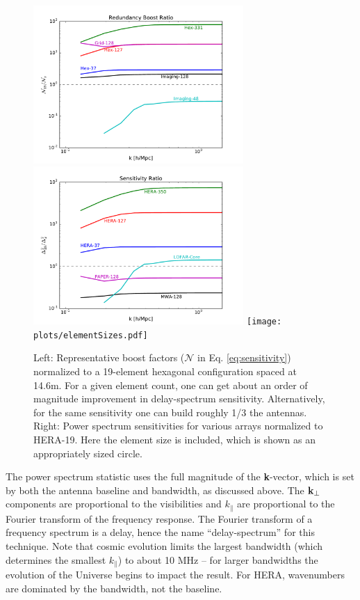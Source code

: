 \documentclass[preprint,11pt]{aastex}
\newcommand{\kvec}{{\bf k}}
\newcommand{\kvpr}{{\kvec_\perp}}
\def\kpar{k_{\|}}
\begin{document}
\begin{figure}[h!]
\centerline{
\includegraphics[height=6cm]{plots/boost.pdf}
\includegraphics[height=6cm]{plots/sensratio.pdf}
\texttt{[image: plots/elementSizes.pdf]}
}
\caption{Left: Representative boost factors ($\mathcal{N}$ in Eq. \ref{eq:sensitivity}) normalized to a 19-element hexagonal configuration spaced at 14.6m.  For a given element count, one can get about an order of
magnitude improvement in delay-spectrum sensitivity.  Alternatively, for the same sensitivity one can build roughly 1/3 the antennas.  Right:  Power spectrum sensitivities for various arrays normalized to HERA-19.  Here the element size is included, which is shown as an appropriately sized circle.}
\label{fig:boost}
\end{figure}

The power spectrum statistic uses the full magnitude of the {\bf k}-vector, which is set by both the antenna baseline and bandwidth, as discussed above.  The $\kvpr$ components are proportional to the visibilities and $\kpar$ are proportional to the Fourier transform of the frequency response.   The Fourier transform of a frequency spectrum is a delay, hence the name ``delay-spectrum'' for this technique.  Note that cosmic evolution limits the largest bandwidth (which determines the smallest $\kpar$) to about 10 MHz -- for larger bandwidths the evolution of the Universe begins to impact the result.  For HERA, wavenumbers are dominated by the bandwidth, not the baseline.
\end{document}
